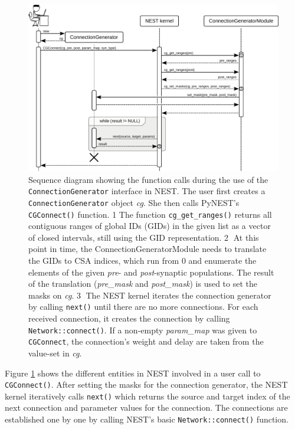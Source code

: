 \documentclass{frontiersSCNS} %
\begin{document}
\begin{figure}[ht]
\centering
\includegraphics[scale=.8]{figures/sequence_diagram_nest.pdf}
\caption{Sequence diagram showing the function calls during the use of
  the \texttt{ConnectionGenerator} interface in NEST. The user first creates a
  \texttt{ConnectionGenerator} object \emph{cg}. She then calls
  PyNEST's \texttt{CGConnect()} function. \textcircled{\footnotesize
    1} The function \texttt{cg\_get\_ranges()} returns all contiguous
  ranges of global IDs (GIDs) in the given list as a vector of closed
  intervals, still using the GID representation.
  \textcircled{\footnotesize 2} At this point in time, the
  ConnectionGeneratorModule needs to translate the GIDs to CSA
  indices, which run from 0 and enumerate the elements of the given
  \emph{pre}- and \emph{post}-synaptic populations. The result of the
  translation (\emph{pre\_mask} and \emph{post\_mask}) is used to set
  the masks on \emph{cg}. \textcircled{\footnotesize 3} The NEST
  kernel iterates the connection generator by calling \texttt{next()}
  until there are no more connections. For each received connection,
  it creates the connection by calling \texttt{Network::connect()}. If
  a non-empty \emph{param\_map} was given to \texttt{CGConnect}, the
  connection's weight and delay are taken from the value-set in
  \emph{cg}.}\label{fig:sequence_diagram_nest}
\end{figure}

Figure \ref{fig:sequence_diagram_nest} shows the different entities in
NEST involved in a user call to \verb|CGConnect()|. After setting the
masks for the connection generator, the NEST kernel iteratively calls
\verb|next()| which returns the source and target index of the next
connection and parameter values for the connection. The connections
are established one by one by calling NEST's basic
\verb|Network::connect()| function.
\end{document}
